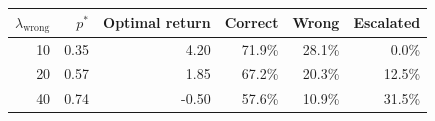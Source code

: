 \begin{tabular}{@{}rrrrrr@{}}
\toprule
$\lambda_{\text{wrong}}$ & $p^*$ & Optimal return & Correct & Wrong & Escalated \\
\midrule
10 & 0.35 & 4.20 & 71.9\% & 28.1\% & 0.0\% \\
20 & 0.57 & 1.85 & 67.2\% & 20.3\% & 12.5\% \\
40 & 0.74 & -0.50 & 57.6\% & 10.9\% & 31.5\% \\
\bottomrule
\end{tabular}
